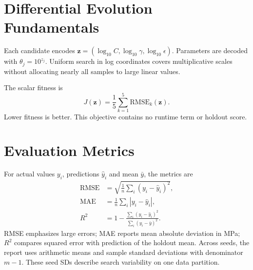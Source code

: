 \section{Differential Evolution Fundamentals}
Each candidate encodes $\mathbf{z}=(\log_{10}C,\log_{10}\gamma,\log_{10}\epsilon)$. Parameters are decoded with $\theta_j=10^{z_j}$. Uniform search in log coordinates covers multiplicative scales without allocating nearly all samples to large linear values.

The scalar fitness is
\begin{equation}J(\mathbf{z})=\frac{1}{5}\sum_{k=1}^{5}\mathrm{RMSE}_k(\mathbf{z}).\end{equation}
Lower fitness is better. This objective contains no runtime term or holdout score.
\section{Evaluation Metrics}
For actual values $y_i$, predictions $\hat y_i$ and mean $\bar y$, the metrics are
\begin{align}\mathrm{RMSE}&=\sqrt{\frac{1}{n}\sum_i(y_i-\hat y_i)^2},\\
\mathrm{MAE}&=\frac{1}{n}\sum_i|y_i-\hat y_i|,\\
R^2&=1-\frac{\sum_i(y_i-\hat y_i)^2}{\sum_i(y_i-\bar y)^2}.\end{align}
RMSE emphasizes large errors; MAE reports mean absolute deviation in MPa; $R^2$ compares squared error with prediction of the holdout mean. Across seeds, the report uses arithmetic means and sample standard deviations with denominator $m-1$. These seed SDs describe search variability on one data partition.
